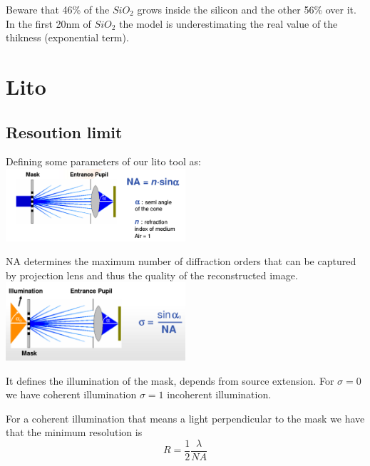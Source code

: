 Beware that 46\% of the $SiO_2$ grows inside the silicon and the other 56\% over it.\\
\vspace{5mm}
In the first 20nm of $SiO_2$ the model is underestimating the real value of the thikness (exponential term).\\


\section{Lito}

\subsection{Resoution limit}
Defining some parameters of our lito tool as:\\

\centering
\includegraphics[width=0.5\textwidth]{NA.png}\\
\raggedright

NA determines the maximum number of diffraction orders that can be captured by projection lens and thus the quality of the reconstructed image.\\

\centering
\includegraphics[width=0.5\textwidth]{sigma.png}\\
\raggedright

It defines the illumination of the mask, depends from source extension. For $\sigma=0$ we have coherent illumination $\sigma=1$ incoherent illumination.\\

\vspace{3mm}

For a coherent illumination that means a light perpendicular to the mask we have that the minimum resolution is 
\begin{equation}
R=\frac{1}{2}\frac{\lambda}{NA}
\end{equation}
\\
\vspace{3mm}


